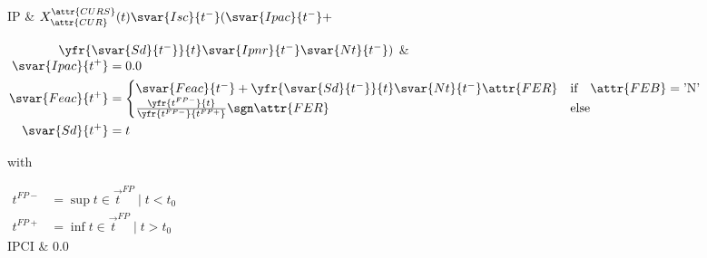 	\hline
	IP & $X_{\attr{CUR}}^{\attr{CURS}}(t)\svar{Isc}{t^-}(\svar{Ipac}{t^-} +$\par
		$\qquad\qquad \yfr{\svar{Sd}{t^-}}{t}\svar{Ipnr}{t^-}\svar{Nt}{t^-})$
		& {$\begin{aligned}
			\svar{Ipac}{t^+} &= 0.0 \\
			\svar{Feac}{t^+} &= \begin{cases} \svar{Feac}{t^-} + \yfr{\svar{Sd}{t^-}}{t}\svar{Nt}{t^-}\attr{FER} & \text{if} \quad \attr{FEB}=\text{'N'} \\
					\frac{\yfr{t^{FP-}}{t}}{\yfr{t^{FP-}}{t^{FP+}}}\sgn\attr{FER} & \text{else} \end{cases} \\
			\svar{Sd}{t^+} &= t \end{aligned}$} \par
		with\par
		{$\begin{aligned}
			t^{FP-} &= \sup t \in \vec{t}^{FP}\mid t<t_0 \\
			t^{FP+} &= \inf t \in \vec{t}^{FP}\mid t>t_0 \end{aligned}$} \\
	\hline
	IPCI & 0.0
